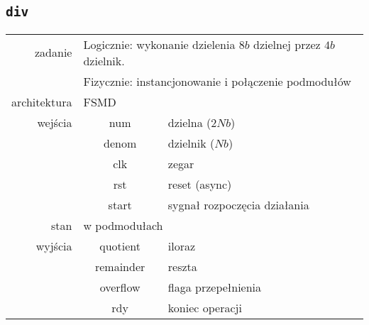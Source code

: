\documentclass[a4paper]{article}
\begin{document}
\subsection{\texttt{div}}
\begin{table}[!h]
	\begin{tabular}{r|c|l}
		zadanie      & \multicolumn{2}{l}{Logicznie: wykonanie dzielenia $8b$ dzielnej przez $4b$ dzielnik.} \\
		             & \multicolumn{2}{l}{Fizycznie: instancjonowanie i połączenie podmodułów} \\
		architektura & \multicolumn{2}{l}{FSMD} \\
		\hline
		wejścia      & num         & dzielna  ($2N b$) \\
		             & denom       & dzielnik ($N b$)  \\
		             & clk         & zegar             \\
		             & rst         & reset (async)     \\
		             & start       & sygnał rozpoczęcia działania \\
		\hline
		stan         & \multicolumn{2}{l}{w podmodułach} \\
		\hline
		wyjścia      & quotient    & iloraz \\
		             & remainder   & reszta \\
		             & overflow    & flaga przepełnienia \\
		             & rdy         & koniec operacji \\
	\end{tabular}
\end{table}
\end{document}
